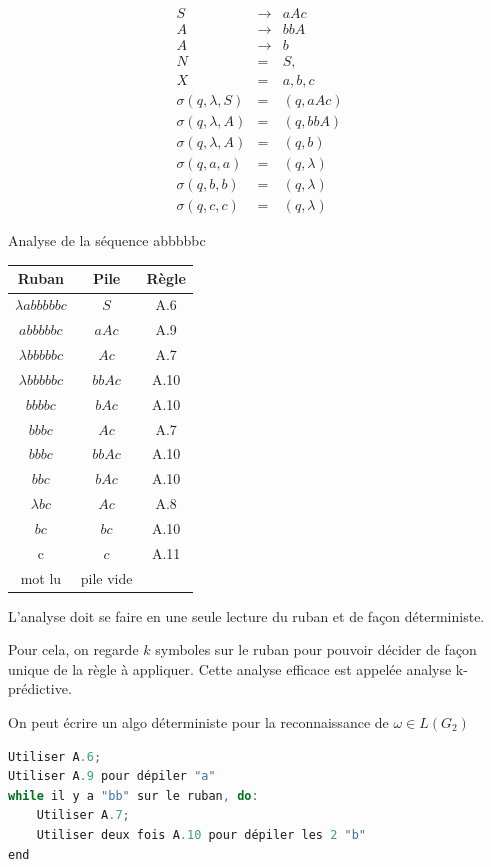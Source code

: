 \documentclass[12pt,a4paper,openany]{book}
\begin{document}
	\begin{exemple}
		\begin{eqnarray}
			S &\rightarrow& aAc\\
			A &\rightarrow& bbA \\
			A &\rightarrow& b \\
			N &=& S,\\
			X &=& a, b, c\\
			\sigma(q, \lambda, S)& =& (q, aAc) \\
			\sigma(q, \lambda, A) &=& (q, bbA)\\
			\sigma(q, \lambda, A) &=& (q, b)\\
			\sigma(q, a, a) &=& (q, \lambda)\\
			\sigma(q, b, b) &=& (q, \lambda)\\
			\sigma(q, c, c) &=& (q, \lambda)
		\end{eqnarray}

		\begin{center}
		Analyse de la séquence abbbbbc

		\begin{tabular}{ccc}
			\textbf{Ruban} & \textbf{Pile} & \textbf{Règle}\\
			\hline
			$\lambda abbbbbc$ &$S$ &A.6\\
			$abbbbbc$ &$aAc$& A.9\\
			$\lambda bbbbbc$ &$Ac$ &A.7\\
			$\lambda bbbbbc$ &$bbAc$& A.10\\
			$bbbbc$ &$bAc$& A.10\\
			$bbbc$ &$Ac$ &A.7\\
			$bbbc$ &$bbAc$& A.10\\
			$bbc$& $bAc$& A.10\\
			$\lambda bc$&$ Ac$& A.8\\
			$bc$& $bc$& A.10\\
			c &$c$& A.11\\
			mot lu &pile vide&
		\end{tabular}
	\end{center}

	L'analyse doit se faire en une seule lecture du ruban et de façon déterministe. 
	
	Pour cela, on regarde $k$ symboles sur le ruban pour pouvoir décider de façon unique de la règle à appliquer. 
	Cette analyse efficace est appelée analyse k-prédictive.

	On peut écrire un algo déterministe pour la reconnaissance de $\omega \in L(G_2 )$
	\begin{lstlisting}[language=C,numbers=none]
Utiliser A.6;
Utiliser A.9 pour dépiler "a"
while il y a "bb" sur le ruban, do:
	Utiliser A.7;
	Utiliser deux fois A.10 pour dépiler les 2 "b"
end
	\end{lstlisting}
	\end{exemple}
	\listoffigures
\end{document}
